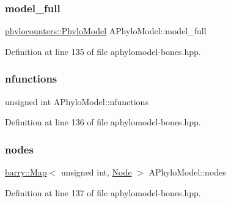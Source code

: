 \mbox{\label{class_a_phylo_model_a79c9e748c657487a60497265348f8a14}} 
\subsubsection{\texorpdfstring{model\+\_\+full}{model\_full}}
{\footnotesize\ttfamily \hyperlink{namespacebarry_1_1counters_1_1phylo_ad32b4186e3bab93119df225fddc3c609}{phylocounters\+::\+Phylo\+Model} A\+Phylo\+Model\+::model\+\_\+full}



Definition at line 135 of file aphylomodel-\/bones.\+hpp.

\mbox{\label{class_a_phylo_model_aceefd34597d56589a10162c937d8200f}} 
\subsubsection{\texorpdfstring{nfunctions}{nfunctions}}
{\footnotesize\ttfamily unsigned int A\+Phylo\+Model\+::nfunctions}



Definition at line 136 of file aphylomodel-\/bones.\+hpp.

\mbox{\label{class_a_phylo_model_af48d7223972ea6f74d2780b316db730e}} 
\subsubsection{\texorpdfstring{nodes}{nodes}}
{\footnotesize\ttfamily \hyperlink{namespacebarry_a979a04835a9855ff2054c383c569c89e}{barry\+::\+Map}$<$ unsigned int, \hyperlink{class_node}{Node} $>$ A\+Phylo\+Model\+::nodes}



Definition at line 137 of file aphylomodel-\/bones.\+hpp.

\mbox{\label{class_a_phylo_model_a3f7a406330ca376840dcea3324e69448}} 
